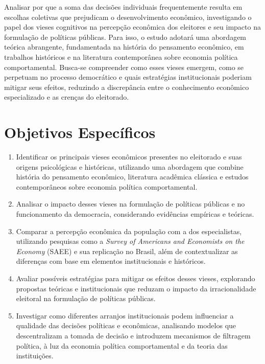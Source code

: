 Analisar por que a soma das decisões individuais frequentemente resulta em escolhas coletivas que prejudicam o desenvolvimento econômico, investigando o papel dos vieses cognitivos na percepção econômica dos eleitores e seu impacto na formulação de políticas públicas. Para isso, o estudo adotará uma abordagem teórica abrangente, fundamentada na história do pensamento econômico, em trabalhos históricos e na literatura contemporânea sobre economia política comportamental. Busca-se compreender como esses vieses emergem, como se perpetuam no processo democrático e quais estratégias institucionais poderiam mitigar seus efeitos, reduzindo a discrepância entre o conhecimento econômico especializado e as crenças do eleitorado.

\section{Objetivos Específicos}

\begin{enumerate}[label=\alph*)]
    \item Identificar os principais vieses econômicos presentes no eleitorado e suas origens psicológicas e históricas, utilizando uma abordagem que combine história do pensamento econômico, literatura acadêmica clássica e estudos contemporâneos sobre economia política comportamental.
    \item Analisar o impacto desses vieses na formulação de políticas públicas e no funcionamento da democracia, considerando evidências empíricas e teóricas.
    \item Comparar a percepção econômica da população com a dos especialistas, utilizando pesquisas como a \textit{Survey of Americans and Economists on the Economy} (SAEE) e sua replicação no Brasil, além de contextualizar as diferenças com base em elementos institucionais e históricos.
    \item Avaliar possíveis estratégias para mitigar os efeitos desses vieses, explorando propostas teóricas e institucionais que reduzam o impacto da irracionalidade eleitoral na formulação de políticas públicas.
    \item Investigar como diferentes arranjos institucionais podem influenciar a qualidade das decisões políticas e econômicas, analisando modelos que descentralizam a tomada de decisão e introduzem mecanismos de filtragem política, à luz da economia política comportamental e da teoria das instituições.
\end{enumerate}

